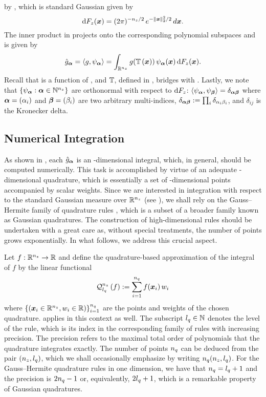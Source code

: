 by \vz, which is standard Gaussian given by
\[
  \d{F_\z(\v{x})} = (2 \pi)^{-\nz/2} \, e^{-\norm[2]{\v{x}}^2 / 2} \, d\v{x}.
\]
The inner product in  projects \g onto the
corresponding polynomial subspaces and is given by
\[
  \hat{\g}_{\multiindex}
  = \innerproduct{\g}{\psi_{\multiindex}}
  = \int_{\real^\nz} \g(\transform{\v{x}}) \, \psi_{\multiindex}(\v{x}) \, \d{F_\z(\v{x})}.
\]
Recall that \g is a function of \vu, and $\transform$, defined in
, bridges \vu with \vz. Lastly, we note that
$\{ \psi_{\multiindex}: \multiindex \in \natural^\nz \}$ are orthonormal with
respect to $\d{F_\z}$:
$\innerproduct{\psi_{\multiindex}}{\psi_{\multiindex[\beta]}} =
\delta_{\multiindex \multiindex[\beta]}$ where $\multiindex = (\alpha_i)$ and
$\multiindex[\beta] = (\beta_i)$ are two arbitrary multi-indices,
$\delta_{\multiindex \multiindex[\beta]} := \prod_i \delta_{\alpha_i \beta_i}$,
and $\delta_{ij}$ is the Kronecker delta.

\subsection{Numerical Integration}

As shown in , each $\hat{\g}_{\multiindex}$ is an
\nz-dimensional integral, which, in general, should be computed numerically.
This task is accomplished by virtue of an adequate \nz-dimensional quadrature,
which is essentially a set of \nz-dimensional points accompanied by scalar
weights. Since we are interested in integration with respect to the standard
Gaussian measure over $\real^\nz$ (see ), we
shall rely on the Gauss--Hermite family of quadrature rules \cite{maitre2010},
which is a subset of a broader family known as Gaussian quadratures. The
construction of high-dimensional rules should be undertaken with a great care
as, without special treatments, the number of points grows exponentially. In
what follows, we address this crucial aspect.

Let $f: \real^\nz \to \real$ and define the quadrature-based approximation of
the integral of $f$ by the linear functional
\[
  \quadrature{\nz}{\lq}{f} := \sum_{i = 1}^\nq f(\v{x}_i) \, w_i
\]
where $\{ (\v{x}_i \in \real^\nz, w_i \in \real) \}_{i = 1}^\nq$ are the points
and weights of the chosen quadrature.  applies in this
context as well. The subscript $\lq \in \natural$ denotes the level of the rule,
which is its index in the corresponding family of rules with increasing
precision. The precision refers to the maximal total order of polynomials that
the quadrature integrates exactly. The number of points $\nq$ can be deduced
from the pair $(\nz, \lq)$, which we shall occasionally emphasize by writing
$\nq(\nz, \lq)$. For the Gauss--Hermite quadrature rules in one dimension, we
have that $\nq = \lq + 1$ and the precision is $2 \nq - 1$ \cite{heiss2008} or,
equivalently, $2 \lq + 1$, which is a remarkable property of Gaussian
quadratures.

